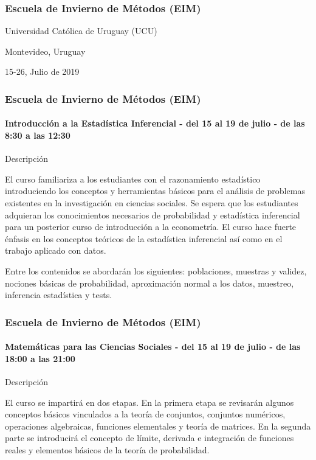 \documentclass{beamer}\usepackage[]{graphicx}\usepackage[]{color}
\begin{document}
 
\begin{frame}
\frametitle{Escuela de Invierno de Métodos (EIM)} 
\vspace{0.5cm}
Universidad Católica de Uruguay (UCU)
\vspace{0.5cm}

Montevideo, Uruguay

\vspace{0.25cm}
15-26, Julio de 2019
\vspace{0.25cm}
\end{frame}



\begin{frame}
\frametitle{Escuela de Invierno de Métodos (EIM)} 
\framesubtitle{Introducción a la Estadística Inferencial - del 15 al 19 de julio - de las 8:30 a las 12:30}
\vspace{0.5cm}

Descripción

\vspace{0.25cm}

El curso familiariza a los estudiantes con el razonamiento estadístico introduciendo los conceptos y herramientas básicos para el análisis de problemas existentes en la investigación en ciencias sociales. Se espera que los estudiantes adquieran los conocimientos necesarios de probabilidad y estadística inferencial para un posterior curso de introducción a la econometría. El curso hace fuerte énfasis en los conceptos teóricos de la estadística inferencial así como en el trabajo aplicado con datos.

\vspace{0.25cm}

Entre los contenidos se abordarán los siguientes: poblaciones, muestras y validez, nociones básicas de probabilidad, aproximación normal a los datos, muestreo, inferencia estadística y tests.
\vspace{0.25cm}
\end{frame}

\begin{frame}
\frametitle{Escuela de Invierno de Métodos (EIM)} 
\framesubtitle{Matemáticas para las Ciencias Sociales - del 15 al 19 de julio - de las 18:00 a las 21:00}
\vspace{0.5cm}

Descripción 

\vspace{0.25cm}

El curso se impartirá en dos etapas. En la primera etapa se revisarán algunos conceptos básicos vinculados a la teoría de conjuntos, conjuntos numéricos, operaciones algebraicas, funciones elementales y teoría de matrices. En la segunda parte se introducirá el concepto de límite, derivada e integración de funciones reales y elementos básicos de la teoría de probabilidad.

\vspace{0.25cm}
\end{frame}
\end{document}

